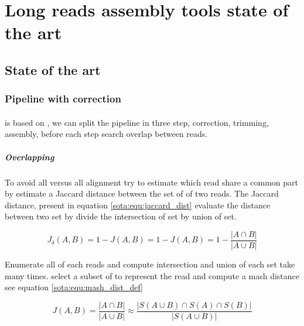 \documentclass[main]{subfiles}
\begin{document}
\chapter{Long reads assembly tools state of the art}

\section{State of the art}

\subsection{Pipeline with correction}

\subsubsection{\canu}

\canu is based on  \cite{celera_first, celera_second}, we can split the \canu pipeline in three step, correction, trimming, assembly, before each step \canu search overlap between reads.

\paragraph{Overlapping}

To avoid all versus all alignment \mhap try to estimate which read share a common part by estimate a Jaccard distance between the set of \kmers of two reads. The Jaccard distance, present in equation \ref{sota:equ:jaccard_dist} evaluate the distance between two set by divide the intersection of set by union of set.

\begin{equation}
J_{\delta}(A,B) = 1 - J(A,B) = 1 -  J(A,B) = 1 - \frac{|A \cap B|}{|A \cup B|}
\label{sota:equ:jaccard_dist}
\end{equation}

Enumerate all \kmers of each reads and compute intersection and union of each set take many times. \mhap select a subset of \kmers to represent the read and compute a mash distance \cite{mash_distance} see equation \ref{sota:equ:mash_dist_def} 

\begin{equation}
J(A,B) = \frac{|A \cap B|}{|A \cup B|} \approx \frac{|S(A \cup B) \cap S(A) \cap S(B)|}{|S(A \cup B)|}
\label{sota:equ:mash_dist_def}
\end{equation}
\end{document}
